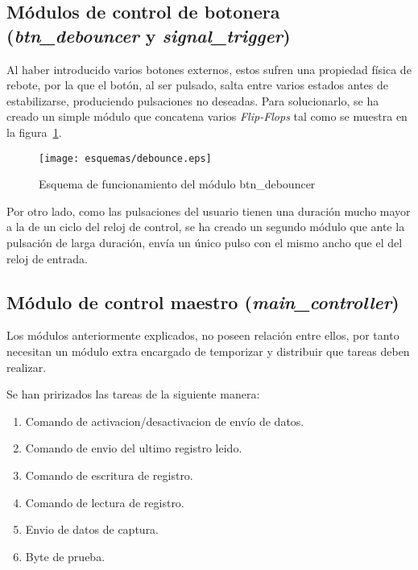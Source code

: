 \subsection{Módulos de control de botonera (\emph{btn\_debouncer} y \emph{signal\_trigger})}
Al haber introducido varios botones externos, estos sufren una propiedad física de rebote, por la que el botón, al ser pulsado, salta entre varios estados antes de estabilizarse, produciendo pulsaciones no deseadas. Para solucionarlo, se ha creado un simple módulo que concatena varios \emph{Flip-Flops} tal como se muestra en la figura~\ref{fig:esquema-debounce}.

\begin{figure}[htb]
    \centering
    \texttt{[image: esquemas/debounce.eps]}
    \caption{Esquema de funcionamiento del módulo btn\_debouncer}
    \label{fig:esquema-debounce}
\end{figure}

Por otro lado, como las pulsaciones del usuario tienen una duración mucho mayor a la de un ciclo del reloj de control, se ha creado un segundo módulo que ante la pulsación de larga duración, envía un único pulso con el mismo ancho que el del reloj de entrada.


\subsection{Módulo de control maestro (\emph{main\_controller})}
Los módulos anteriormente explicados, no poseen relación entre ellos, por tanto necesitan un módulo extra encargado de temporizar y distribuir que tareas deben realizar.

Se han pririzados las tareas de la siguiente manera:
\begin{enumerate}
    \item Comando de activacion/desactivacion de envío de datos.
    \item Comando de envio del ultimo registro leido.
    \item Comando de escritura de registro.
    \item Comando de lectura de registro.
    \item Envio de datos de captura.
    \item Byte de prueba.
\end{enumerate}


